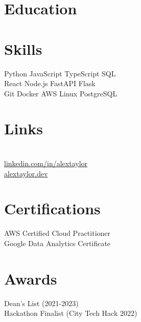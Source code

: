 \documentclass[]{deedy-resume-openfont}
\begin{document}


\begin{minipage}[t]{0.33\textwidth}

\section{Education}
\sectionsep

\section{Skills}
Python \textbullet{} JavaScript \textbullet{} TypeScript \textbullet{} SQL \\
React \textbullet{} Node.js \textbullet{} FastAPI \textbullet{} Flask \\
Git \textbullet{} Docker \textbullet{} AWS \textbullet{} Linux \textbullet{} PostgreSQL
\sectionsep

\section{Links}
\href{https://github.com/alextaylor}{\color{blue}{github.com/alextaylor}}\\
\href{https://www.linkedin.com/in/alextaylor}{linkedin.com/in/alextaylor}\\
\href{https://alextaylor.dev}{alextaylor.dev}\\
\sectionsep

\section{Certifications}
AWS Certified Cloud Practitioner\\
Google Data Analytics Certificate\\
\sectionsep

\section{Awards}
Dean's List (2021-2023)\\
Hackathon Finalist (City Tech Hack 2022)\\
\sectionsep

\end{minipage}
\end{document}
